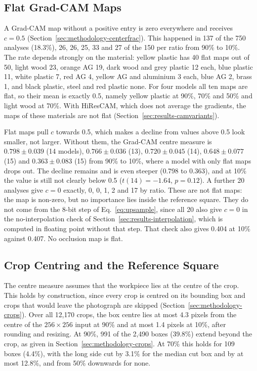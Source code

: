\subsection{Flat Grad-CAM Maps}
\label{sec:results-degeneracy}

A Grad-CAM map without a positive entry is zero everywhere and receives $c = 0.5$
(Section~\ref{sec:methodology-centerfrac}). This happened in 137 of the 750 analyses
(18.3\%), 26, 26, 25, 33 and 27 of the 150 per ratio from 90\% to 10\%. The rate
depends strongly on the material: yellow plastic has 40 flat maps out of 50, light wood
23, orange AG 19, dark wood and grey plastic 12 each, blue plastic 11, white plastic 7,
red AG 4, yellow AG and aluminium 3 each, blue AG 2, brass 1, and black plastic, steel
and red plastic none. For four models all ten maps are flat, so their mean is exactly
0.5, namely yellow plastic at 90\%, 70\% and 50\% and light wood at 70\%. With
HiResCAM, which does not average the gradients, the maps of these materials are not flat
(Section~\ref{sec:results-camvariants}).

Flat maps pull $c$ towards 0.5, which makes a decline from values above 0.5 look
smaller, not larger. Without them, the Grad-CAM centre measure is $0.798 \pm 0.039$
(14 models), $0.766 \pm 0.036$ (13), $0.720 \pm 0.045$ (14), $0.648 \pm 0.077$ (15) and
$0.363 \pm 0.083$ (15) from 90\% to 10\%, where a model with only flat maps drops out.
The decline remains and is even steeper (0.798 to 0.363), and at 10\% the value is
still not clearly below 0.5 ($t(14) = -1.64$, $p = 0.12$). A further 20 analyses give
$c = 0$ exactly, 0, 0, 1, 2 and 17 by ratio. These are not flat maps: the map is
non-zero, but no importance lies inside the reference square. They do not come from the
8-bit step of Eq.~\eqref{eq:upsample}, since all 20 also give $c = 0$ in the
no-interpolation check of Section~\ref{sec:results-interpolation}, which is computed in
floating point without that step. That check also gives 0.404 at 10\% against 0.407. No
occlusion map is flat.

\subsection{Crop Centring and the Reference Square}
\label{sec:results-centering}

The centre measure assumes that the workpiece lies at the centre of the crop. This
holds by construction, since every crop is centred on its bounding box and crops that
would leave the photograph are skipped (Section~\ref{sec:methodology-crops}). Over all
12,170 crops, the box centre lies at most 4.3 pixels from the centre of the
$256 \times 256$ input at 90\% and at most 1.4 pixels at 10\%, after rounding and
resizing. At 90\%, 991 of the 2,490 boxes
(39.8\%) extend beyond the crop, as given in Section~\ref{sec:methodology-crops}. At
70\% this holds for 109 boxes (4.4\%), with the long side cut by 3.1\% for the median
cut box and by at most 12.8\%, and from 50\% downwards for none.

